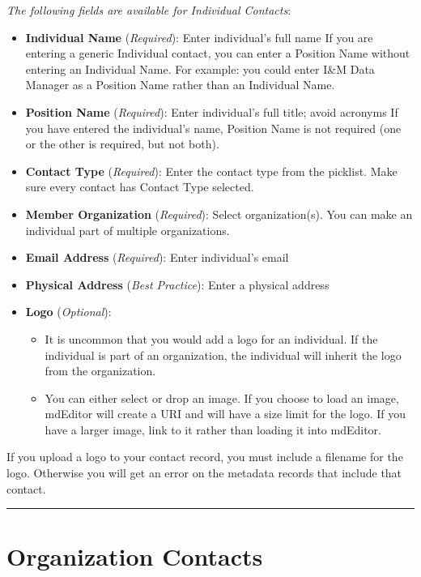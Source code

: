 \documentclass[
]{book}
\providecommand{\tightlist}{%
  \setlength{\itemsep}{0pt}\setlength{\parskip}{0pt}}
\begin{document}
\emph{The following fields are available for Individual Contacts}:

\begin{itemize}
\item
  \textbf{Individual Name} (\emph{Required}): Enter individual's full name If you are entering a generic Individual contact, you can enter a Position Name without entering an Individual Name. For example: you could enter I\&M Data Manager as a Position Name rather than an Individual Name.
\item
  \textbf{Position Name} (\emph{Required}): Enter individual's full title; avoid acronyms If you have entered the individual's name, Position Name is not required (one or the other is required, but not both).
\item
  \textbf{Contact Type} (\emph{Required}): Enter the contact type from the picklist. Make sure every contact has Contact Type selected.
\item
  \textbf{Member Organization} (\emph{Required}): Select organization(s). You can make an individual part of multiple organizations.
\item
  \textbf{Email Address} (\emph{Required}): Enter individual's email
\item
  \textbf{Physical Address} (\emph{Best Practice}): Enter a physical address
\item
  \textbf{Logo} (\emph{Optional}):

  \begin{itemize}
  \tightlist
  \item
    It is uncommon that you would add a logo for an individual. If the individual is part of an organization, the individual will inherit the logo from the organization.
  \item
    You can either select or drop an image. If you choose to load an image, mdEditor will create a URI and will have a size limit for the logo. If you have a larger image, link to it rather than loading it into mdEditor.
  \end{itemize}
\end{itemize}

If you upload a logo to your contact record, you must include a filename for the logo. Otherwise you will get an error on the metadata records that include that contact.

\begin{center}\rule{0.5\linewidth}{\linethickness}\end{center}

\hypertarget{organization-contacts}{%
\section{Organization Contacts}\label{organization-contacts}}
\end{document}

